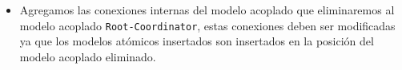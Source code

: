 \documentclass{beamer}
\begin{document}

\begin{frame}[fragile]
\begin{itemize}
        \item Agregamos las conexiones internas del modelo acoplado que eliminaremos al modelo acoplado \texttt{Root-Coordinator}, estas conexiones deben ser 
        modificadas ya que los modelos atómicos insertados son insertados en la posición del modelo acoplado eliminado.
\end{itemize}
\end{frame}
\end{document}
